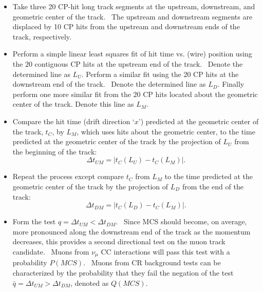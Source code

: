 \documentclass{article}
\begin{document}
\begin{itemize}
\item Take three 20 CP-hit long track segments at the upstream, downstream,
and geometric center of the track. \ The upstream and downstream segments
are displaced by 10 CP hits from the upstream and downstream ends of the
track, respectively.

\item Perform a simple linear least squares fit of hit time vs. (wire) position
using the $20$ contiguous CP hits at the upstream end of the track. \ Denote
the determined line as $L_{U}$. Perform a similar fit using the $20$ CP hits at the downstream end of the
track. \ Denote the determined line as $L_{D}.$ Finally perform one more similar fit from the $20$ CP hits located about the
geometric center of the track. Denote this line as $L_{M}$.

\item Compare the hit time (drift direction `$x$') predicted at the geometric center of the track, $%
t_{C}$, by $L_{M}$, which uses hits about the geometric center, to the time
predicted at the geometric center of the track by the projection of $L_{U}$
from the beginning of the track: 
\begin{equation}
\Delta t_{UM}=\left\vert t_{C}\left( L_{U}\right) -t_{C}\left( L_{M}\right)
\right\vert .
\end{equation}

\item Repeat the process except compare $t_{C}$ from $L_{M}$ to the time
predicted at the geometric center of the track by the projection of $L_{D}$
from the end of the track:%
\begin{equation}
\Delta t_{DM}=\left\vert t_{C}\left( L_{D}\right) -t_{C}\left( L_{M}\right)
\right\vert .
\end{equation}

\item Form the test $q=\Delta t_{UM}<\Delta t_{DM}$. \ Since MCS should
become, on average, more pronounced along the downstream end of the track as
the momentum decreases, this provides a second directional test on the muon
track candidate. \ Muons from $\nu _{\mu }$ CC interactions will pass this
test with a probability $P\left( MCS\right) $. \ Muons from CR background
tests can be characterized by the probability that they fail the negation of
the test $\bar{q}=\Delta t_{UM}>\Delta t_{DM}$, denoted as $%
Q\left( MCS\right) .$
\end{itemize}
\end{document}
